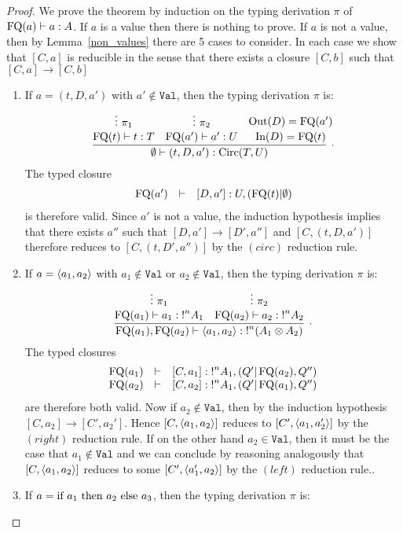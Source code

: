 \documentclass[twoside]{article}
\begin{document}
\begin{proof}
We prove the theorem by induction on the typing derivation $\pi$ of 
$\mathop{\textrm{FQ}}\nolimits(a)\vdash a:A$. If $a$ is a value then there is nothing 
to prove. If $a$ is not a value, then by 
Lemma~\hyperref[non_values]{\ref*{non_values}} there are 5 cases to consider. 
In each case we show that $[C,a]$ is reducible in the sense that there exists a 
closure  $[C,b]$ such that $[C,a]\to[C,b]$
\begin{enumerate}
  \item If $a=(t,D,a')$ with $a'\notin \mathtt{Val}$, then the typing derivation 
  $\pi$ is:
  \[
  \infer[.]{\emptyset\entails (t,D,a'):\Circ(T,U)}{
    \deduce[]{\FQ(t)\entails t:T}{
      \vdots ~\pi_1
    }
    &
    \deduce[]{\FQ(a')\entails a':U}{
      \vdots ~\pi_2     
    }
    &
    \deduce[]{\In(D)=\FQ(t)}{
      \Out(D)=\FQ(a')
    }
  }   
  \]
  The typed closure 
  \[
  \begin{array}{rcl}
  \mathop{\textrm{FQ}}\nolimits(a') & \vdash & [D,a']:U,(\mathop{\textrm{FQ}}\nolimits(t)|\emptyset)
  \end{array}
  \]
  is therefore valid. Since $a'$ 
  is not a value, the induction hypothesis implies that there exists $a''$ such 
  that $[D,a']\to [D',a'']$ and $[C,(t,D,a')]$ therefore reduces to 
  $[C,(t,D',a'')]$ by the $(circ)$ reduction rule.
  \item If $a=\langle a_1,a_2\rangle$ with $a_1\notin \mathtt{Val}$ or $a_2\notin \mathtt{Val}$,
  then the typing derivation $\pi$ is:
  \[
  \infer[.]{\FQ(a_1),\FQ(a_2)\entails \p{a_1,a_2}:{!}^n(A_1\x A_2)}{
    \deduce[]{\FQ(a_1)\entails a_1:{!}^nA_1}{
      \vdots~\pi_1
    }
    & 
    \deduce[]{\FQ(a_2)\entails a_2:{!}^nA_2}{
      \vdots~\pi_2
    }
  }
  \] 
  The typed closures 
  \[
  \begin{array}{rcl}
  \mathop{\textrm{FQ}}\nolimits(a_1) & \vdash & [C,a_1]:{!}^nA_1,(Q'|\mathop{\textrm{FQ}}\nolimits(a_2),Q'')\\
  \mathop{\textrm{FQ}}\nolimits(a_2) & \vdash & [C,a_2]:{!}^nA_1, (Q'|\mathop{\textrm{FQ}}\nolimits(a_1),Q'')
  \end{array}
  \]
  are therefore both valid. 
  Now if $a_2\notin\mathtt{Val}$, then by the induction hypothesis 
  $[C,a_2]\to[C',a_2']$. Hence $[C,\langle a_1,a_2\rangle]$ reduces to $[C',\langle a_1,a_2'\rangle]$ 
  by the $(right)$ reduction rule.
  If on the other hand $a_2\in\mathtt{Val}$, then it must be the case that $a_1\notin\mathtt{Val}$ 
  and we can conclude by reasoning analogously that $[C,\langle a_1,a_2\rangle]$ reduces to 
  some $[C',\langle a_1',a_2\rangle]$ by the $(left)$ reduction rule.. 
  \item If $a=\textrm{\rm if}~ a_1 ~\textrm{\rm then}~ a_2 ~\textrm{\rm else}~ a_3$, then the typing derivation $\pi$ is:

\end{enumerate}
\end{proof}
\end{document}
